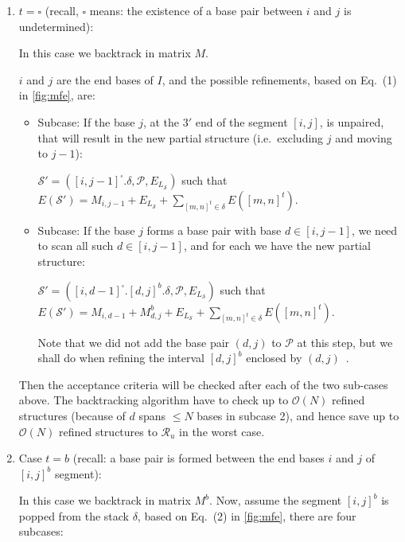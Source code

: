 \begin{enumerate}\item
	$t = \square$ (recall, $\square$ means: the existence of a base pair between $i$ and $j$ is undetermined): 
	
	In this case we backtrack in matrix $M$.  
	
	$i$ and $j$ are the end bases of $I$, and the possible refinements, based on Eq.~(1) in \cref{fig:mfe}, are: 
	
	\begin{itemize}
		\item Subcase: If the base $j$, at the $3'$ end of the segment $[i,j]$, is unpaired, that will result in the new partial structure (i.e.~excluding $j$ and moving to $j-1$):
		
		$\mathcal{S}' = ([i,j-1]^\square.\delta, \mathcal{P}, E_{L_{\mathcal{S}}})$ such that $E(\mathcal{S}') = M_{i,j-1} + E_{L_{\mathcal{S}}} 
		+ \sum \limits_{[m,n]^t \in \delta} E([m,n]^t)$.
		
		\item 	Subcase: If the base $j$ forms a base pair with base $d \in [i,j-1]$,  we need to scan all such  $d \in [i,j-1]$, 
		and for each we have the new partial structure:
		
		$\mathcal{S}' = ([i,d-1]^\square.[d,j]^b.\delta, \mathcal{P}, E_{L_{\mathcal{S}}})$ such that $E(\mathcal{S}') = M_{i,d-1} + M^b_{d,j}  +E_{L_{\mathcal{S}}} 
		+ \sum \limits_{[m,n]^t \in \delta} E([m,n]^t)$. 
		
		Note that we did not add the base pair $(d,j)$ to $\mathcal{P}$ at this step, but we shall do when refining the interval
		$[d,j]^b$ enclosed by $(d,j)$~\cite{wuchty1999complete}. 	
	\end{itemize}
	
	Then the acceptance criteria will be checked after each of the two sub-cases above. The backtracking algorithm have to  check up to $\mathcal{O}(N)$ refined structures (because of $d$ spans $\leq N$ bases in subcase 2), and hence save up to  $\mathcal{O}(N)$ refined structures to $\mathcal{R}_u$ in the worst case.   
	
	\item
	Case $t = b$ (recall: a base pair is formed between the end bases $i$ and $j$ of $[i,j]^b$ segment):
	
	In this case we backtrack in matrix $M^b$. 	
	Now, assume the segment $[i,j]^b$ is popped from the stack $\delta$, based on Eq.~(2) in \cref{fig:mfe}, there are four subcases:
	

\end{enumerate}
